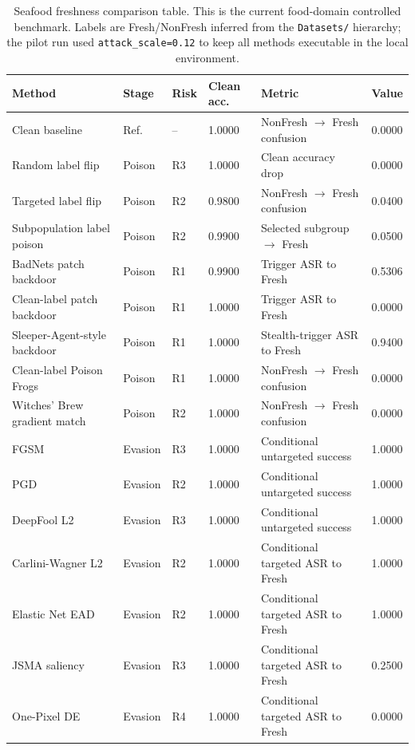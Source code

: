 ﻿\documentclass[6p,10pt,times]{ieeeaccess}
\begin{document}
\begin{table}[t]
\centering
\caption{Seafood freshness comparison table. This is the current food-domain controlled benchmark. Labels are Fresh/NonFresh inferred from the \texttt{Datasets/} hierarchy; the pilot run used \texttt{attack\_scale=0.12} to keep all methods executable in the local environment.}
\label{tab:seafoodresults}
\small
\begin{tabular}{p{}p{}p{}p{}p{}p{}}
\toprule
Method & Stage & Risk & Clean acc. & Metric & Value \\
\midrule
Clean baseline & Ref. & -- & 1.0000 & NonFresh \(\rightarrow\) Fresh confusion & 0.0000 \\
Random label flip & Poison & R3 & 1.0000 & Clean accuracy drop & 0.0000 \\
Targeted label flip & Poison & R2 & 0.9800 & NonFresh \(\rightarrow\) Fresh confusion & 0.0400 \\
Subpopulation label poison & Poison & R2 & 0.9900 & Selected subgroup \(\rightarrow\) Fresh & 0.0500 \\
BadNets patch backdoor & Poison & R1 & 0.9900 & Trigger ASR to Fresh & 0.5306 \\
Clean-label patch backdoor & Poison & R1 & 1.0000 & Trigger ASR to Fresh & 0.0000 \\
Sleeper-Agent-style backdoor & Poison & R1 & 1.0000 & Stealth-trigger ASR to Fresh & 0.9400 \\
Clean-label Poison Frogs & Poison & R1 & 1.0000 & NonFresh \(\rightarrow\) Fresh confusion & 0.0000 \\
Witches' Brew gradient match & Poison & R2 & 1.0000 & NonFresh \(\rightarrow\) Fresh confusion & 0.0000 \\
FGSM & Evasion & R3 & 1.0000 & Conditional untargeted success & 1.0000 \\
PGD & Evasion & R2 & 1.0000 & Conditional untargeted success & 1.0000 \\
DeepFool L2 & Evasion & R3 & 1.0000 & Conditional untargeted success & 1.0000 \\
Carlini-Wagner L2 & Evasion & R2 & 1.0000 & Conditional targeted ASR to Fresh & 1.0000 \\
Elastic Net EAD & Evasion & R2 & 1.0000 & Conditional targeted ASR to Fresh & 1.0000 \\
JSMA saliency & Evasion & R3 & 1.0000 & Conditional targeted ASR to Fresh & 0.2500 \\
One-Pixel DE & Evasion & R4 & 1.0000 & Conditional targeted ASR to Fresh & 0.0000 \\

\end{tabular}
\end{table}
\end{document}
